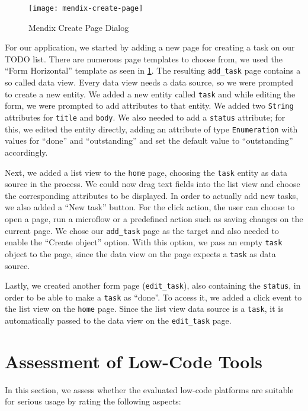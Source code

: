 \documentclass[runningheads]{llncs}
\begin{document}
\begin{figure}
  \centering
  \texttt{[image: mendix-create-page]}
  \caption{Mendix Create Page Dialog}
  \label{fig:mendix_create_page}
\end{figure}

For our application, we started by adding a new page for creating a task on our TODO list. There are numerous page templates to choose from, we used the “Form Horizontal” template as seen in \cref{fig:mendix_create_page}. The resulting \texttt{add\_task} page contains a so called data view. Every data view needs a data source, so we were prompted to create a new entity. We added a new entity called \texttt{task} and while editing the form, we were prompted to add attributes to that entity. We added two \texttt{String} attributes for \texttt{title} and \texttt{body}. We also needed to add a \texttt{status} attribute; for this, we edited the entity directly, adding an attribute of type \texttt{Enumeration} with values for “done” and “outstanding” and set the default value to “outstanding” accordingly.

Next, we added a list view to the \texttt{home} page, choosing the \texttt{task} entity as data source in the process. We could now drag text fields into the list view and choose the corresponding attributes to be displayed. In order to actually add new tasks, we also added a “New task” button. For the click action, the user can choose to open a page, run a microflow or a predefined action such as saving changes on the current page. We chose our \texttt{add\_task} page as the target and also needed to enable the “Create object” option. With this option, we pass an empty \texttt{task} object to the page, since the data view on the page expects a \texttt{task} as data source.

Lastly, we created another form page (\texttt{edit\_task}), also containing the \texttt{status}, in order to be able to make a \texttt{task} as “done”. To access it, we added a click event to the list view on the \texttt{home} page. Since the list view data source is a \texttt{task}, it is automatically passed to the data view on the \texttt{edit\_task} page.

\section{Assessment of Low-Code Tools}
\label{sec:assessment_of_tools}

In this section, we assess whether the evaluated low-code platforms are suitable for serious usage by rating the following aspects:
\end{document}
